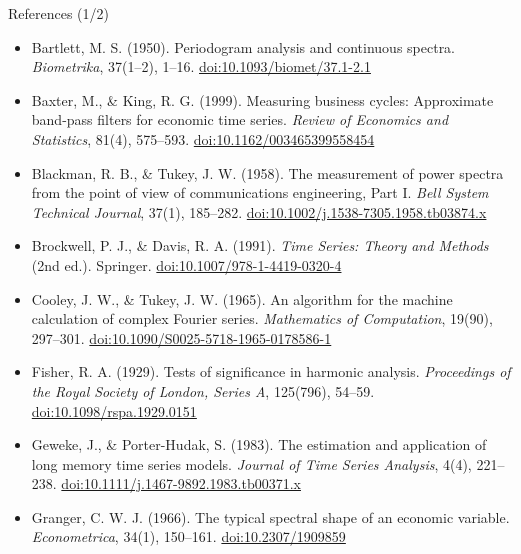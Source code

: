 \begin{frame}{References (1/2)}
\itemsize{\scriptsize}
\begin{itemize}
    \item Bartlett, M. S. (1950). Periodogram analysis and continuous spectra. \textit{Biometrika}, 37(1--2), 1--16. \href{https://doi.org/10.1093/biomet/37.1-2.1}{doi:10.1093/biomet/37.1-2.1}
    \item Baxter, M., \& King, R. G. (1999). Measuring business cycles: Approximate band-pass filters for economic time series. \textit{Review of Economics and Statistics}, 81(4), 575--593. \href{https://doi.org/10.1162/003465399558454}{doi:10.1162/003465399558454}
    \item Blackman, R. B., \& Tukey, J. W. (1958). The measurement of power spectra from the point of view of communications engineering, Part I. \textit{Bell System Technical Journal}, 37(1), 185--282. \href{https://doi.org/10.1002/j.1538-7305.1958.tb03874.x}{doi:10.1002/j.1538-7305.1958.tb03874.x}
    \item Brockwell, P. J., \& Davis, R. A. (1991). \textit{Time Series: Theory and Methods} (2nd ed.). Springer. \href{https://doi.org/10.1007/978-1-4419-0320-4}{doi:10.1007/978-1-4419-0320-4}
    \item Cooley, J. W., \& Tukey, J. W. (1965). An algorithm for the machine calculation of complex Fourier series. \textit{Mathematics of Computation}, 19(90), 297--301. \href{https://doi.org/10.1090/S0025-5718-1965-0178586-1}{doi:10.1090/S0025-5718-1965-0178586-1}
    \item Fisher, R. A. (1929). Tests of significance in harmonic analysis. \textit{Proceedings of the Royal Society of London, Series A}, 125(796), 54--59. \href{https://doi.org/10.1098/rspa.1929.0151}{doi:10.1098/rspa.1929.0151}
    \item Geweke, J., \& Porter-Hudak, S. (1983). The estimation and application of long memory time series models. \textit{Journal of Time Series Analysis}, 4(4), 221--238. \href{https://doi.org/10.1111/j.1467-9892.1983.tb00371.x}{doi:10.1111/j.1467-9892.1983.tb00371.x}
    \item Granger, C. W. J. (1966). The typical spectral shape of an economic variable. \textit{Econometrica}, 34(1), 150--161. \href{https://doi.org/10.2307/1909859}{doi:10.2307/1909859}
\end{itemize}
\end{frame}

